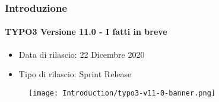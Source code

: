 %

\begin{frame}[fragile]
	\frametitle{Introduzione}
	\framesubtitle{TYPO3 Versione 11.0 - I fatti in breve}

	\begin{itemize}
		\item Data di rilascio: 22 Dicembre 2020
		\item Tipo di rilascio: Sprint Release
	\end{itemize}

	\begin{figure}
		\texttt{[image: Introduction/typo3-v11-0-banner.png]}
	\end{figure}

\end{frame}

